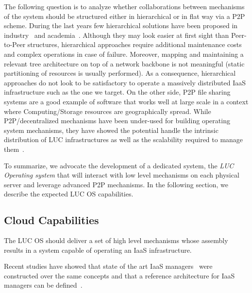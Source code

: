 The following question is to analyze whether collaborations between mechanisms of the system should be structured either in hierarchical or in
flat way via a P2P scheme. During the last years few hierarchical solutions have been proposed in industry~\cite{cascading-os, cells} and
academia~\cite{farahnakian:cloudcom14,feller:snooze}. Although they may look easier at first sight than Peer-to-Peer structures, hierarchical
approaches require additional maintenance costs and complex operations in case of failure.  Moreover, mapping and maintaining a relevant tree
architecture on top of a network backbone is not meaningful (static partitioning of resources is usually performed). As a consequence, hierarchical
approaches do not look to be satisfactory to operate a massively distributed IaaS infrastructure such as the one we target. On the other side, P2P
file sharing systems are a good example of software that works well at large scale in a context where Computing/Storage resources are geographically
spread. While P2P/decentralized mechanisms have been under-used for building operating system mechanisms, they have showed the potential handle the
intrinsic distribution of LUC infrastructures as well as the scalability required to manage them~\cite{decandia:dynamo}.

To summarize, we advocate the development of a dedicated system, \ie the \emph{LUC Operating system} that will interact with low level mechanisms on
each physical server and leverage advanced P2P mechanisms.
In the following section, we describe the expected LUC OS capabilities.

\subsection{Cloud Capabilities}

The LUC OS should deliver a set of high level mechanisms whose assembly results in a system capable of operating an IaaS infrastructure.

Recent studies have showed that state of the art IaaS managers~\cite{peng:2009} were constructed over the same concepts and that a reference
architecture for IaaS managers can be defined~\cite{moreno2012iaas}.

